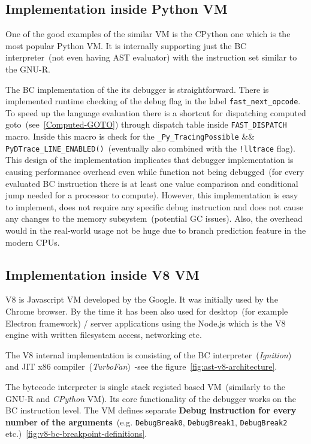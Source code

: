 \documentclass[thesis=M,english]{FITthesis}[2018/10/20]
\newcommand{\code}[1]{\texttt{#1}}
\begin{document}
\subsection{Implementation inside Python VM}\label{bcdebug-implementation-in-python}

One of the good examples of the similar VM is the CPython one which is the most popular Python VM. It is internally supporting just the BC interpreter~(not even having AST evaluator) with the instruction set similar to the GNU-R.

The BC implementation of the its debugger is straightforward. There is implemented runtime checking of the debug flag in the label \code{fast{\_}next{\_}opcode}. To speed up the language evaluation there is a shortcut for dispatching computed goto~(see~\ref{Computed-GOTO}) through dispatch table inside \code{FAST{\_}DISPATCH} macro. Inside this macro is check for the \code{{\!}{\_}Py{\_}TracingPossible} {\&\&} \code{{\!}PyDTrace{\_}LINE{\_}ENABLED()}~(eventually also combined with the \code{!lltrace} flag). This design of the implementation implicates that debugger implementation is causing performance overhead even while function not being debugged~(for every evaluated BC instruction there is at least one value comparison and conditional jump needed for a processor to compute). However, this implementation is easy to implement, does not require any specific debug instruction and does not cause any changes to the memory subsystem~(potential GC issues). Also, the overhead would in the real-world usage not be huge due to branch prediction feature in the modern CPUs.


\subsection{Implementation inside V8 VM}\label{bcdebug-implementation-in-v8}

V8 is Javascript VM developed by the Google. It was initially used by the Chrome browser. By the time it has been also used for desktop~(for example Electron framework) / server applications using the Node.js which is the V8 engine with written filesystem access, networking etc.

The V8 internal implementation is consisting of the BC interpreter~(\textit{Ignition}) and JIT x86 compiler~(\textit{TurboFan})~-see the figure~\ref{fig:ast-v8-architecture}.

The bytecode interpreter is single stack registed based VM~(similarly to the GNU-R and \textit{CPython} VM). Its core functionality of the debugger works on the BC instruction level. The VM defines separate \textbf{Debug instruction for every number of the arguments}~(e.g. \code{DebugBreak0}, \code{DebugBreak1}, \code{DebugBreak2} etc.)~\ref{fig:v8-bc-breakpoint-definitions}.
\end{document}
